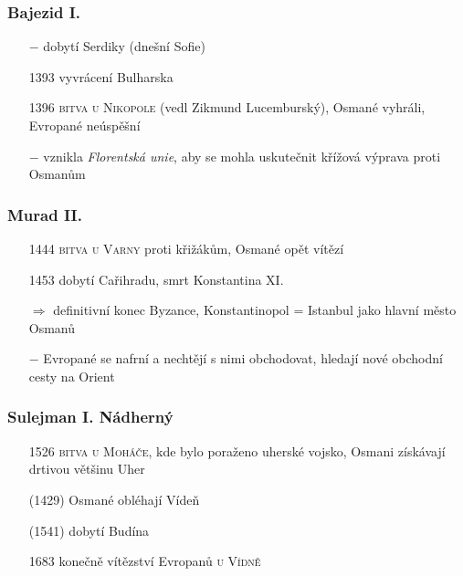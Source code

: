 \documentclass{article}
\begin{document}
\subsubsection*{Bajezid I.}
\begin{itemize}
    \vspace{-0.5em}
    \setlength\itemsep{0.15em}
    \item[$-$] dobytí Serdiky (dnešní Sofie)
    \item[1393] vyvrácení Bulharska
    \item[1396] \textsc{bitva u Nikopole} (vedl Zikmund Lucemburský), Osmané vyhráli, Evropané neúspěšní
    \item[$-$] vznikla \textit{Florentská unie}, aby se mohla uskutečnit křížová výprava proti Osmanům
\end{itemize}

\subsubsection*{Murad II.}
\begin{itemize}
    \vspace{-0.5em}
    \setlength\itemsep{0.15em}
    \item[1444] \textsc{bitva u Varny} proti křižákům, Osmané opět vítězí
\end{itemize}

\begin{itemize}
    \vspace{-0.5em}
    \setlength\itemsep{0.15em}
    \item[1453] dobytí Cařihradu, smrt Konstantina XI.
    \item[$\Rightarrow$] definitivní konec Byzance, Konstantinopol = Istanbul jako hlavní město Osmanů
    \item[$-$] Evropané se nafrní a nechtějí s nimi obchodovat, hledají nové obchodní cesty na Orient
\end{itemize}

\subsubsection*{Sulejman I. Nádherný}
\begin{itemize}
    \vspace{-0.5em}
    \setlength\itemsep{0.15em}
    \item[1526] \textsc{bitva u Moháče}, kde bylo poraženo uherské vojsko, Osmani získávají drtivou většinu Uher
    \item[(1429)] Osmané obléhají Vídeň
    \item[(1541)] dobytí Budína
    \item[1683] konečně vítězství Evropanů \textsc{u Vídně}
\end{itemize}
\end{document}
